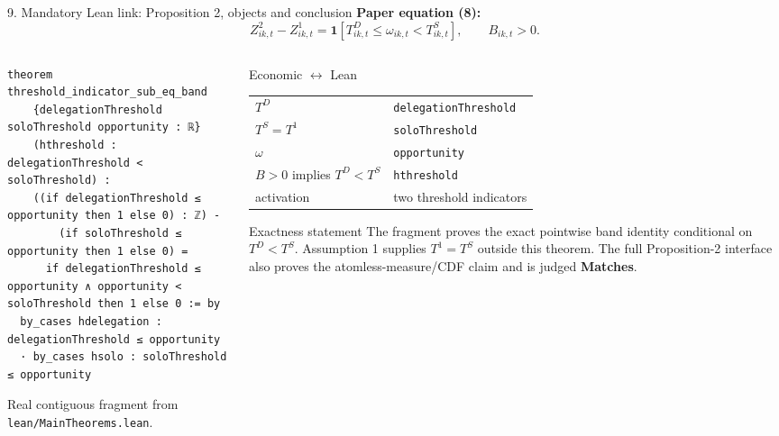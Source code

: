 \documentclass[aspectratio=169,10pt]{beamer}
\newcommand{\source}[1]{\textcolor{Slate}{\scriptsize #1}}
\begin{document}
\begin{frame}[fragile]{9. Mandatory Lean link: Proposition 2, objects and conclusion}
  \vspace{-0.06cm}
  \textbf{Paper equation (8):}
  \[
    Z^2_{ik,t}-Z^1_{ik,t}
    =\mathbf 1\!\left[T^D_{ik,t}\le\omega_{ik,t}<T^S_{ik,t}\right],
    \qquad B_{ik,t}>0.
  \]

  \vspace{-0.14cm}
  \begin{columns}[T,onlytextwidth]
    \begin{column}{0.61\textwidth}
\begin{lstlisting}[basicstyle=\ttfamily\fontsize{7.2}{8.1}\selectfont]
theorem threshold_indicator_sub_eq_band
    {delegationThreshold soloThreshold opportunity : ℝ}
    (hthreshold : delegationThreshold < soloThreshold) :
    ((if delegationThreshold ≤ opportunity then 1 else 0) : ℤ) -
        (if soloThreshold ≤ opportunity then 1 else 0) =
      if delegationThreshold ≤ opportunity ∧ opportunity < soloThreshold then 1 else 0 := by
  by_cases hdelegation : delegationThreshold ≤ opportunity
  · by_cases hsolo : soloThreshold ≤ opportunity
\end{lstlisting}
      \source{Real contiguous fragment from \texttt{lean/MainTheorems.lean}.}
    \end{column}
    \begin{column}{0.35\textwidth}
      \begin{block}{Economic $\leftrightarrow$ Lean}
        \scriptsize
        \begin{tabular}{@{}ll@{}}
          $T^D$ & \texttt{delegationThreshold}\\
          $T^S=T^1$ & \texttt{soloThreshold}\\
          $\omega$ & \texttt{opportunity}\\
          \shortstack[l]{$B>0$ implies\\$T^D<T^S$} & \texttt{hthreshold}\\
          activation & two threshold indicators
        \end{tabular}
      \end{block}
      \begin{exampleblock}{Exactness statement}
        \scriptsize The fragment proves the exact pointwise band identity conditional on $T^D<T^S$. Assumption 1 supplies $T^1=T^S$ outside this theorem. The full Proposition-2 interface also proves the atomless-measure/CDF claim and is judged \textbf{Matches}.
      \end{exampleblock}
    \end{column}
  \end{columns}
\end{frame}
\end{document}
